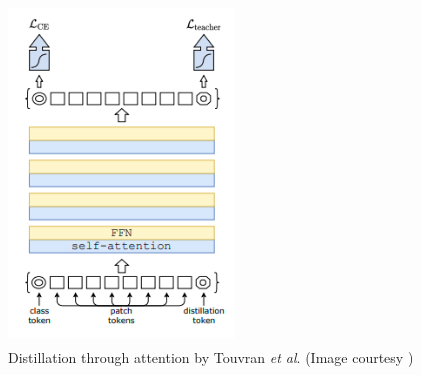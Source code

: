 \begin{figure} [H]
	\centering
	\includegraphics[width=6cm, height=9cm] {assets/img/deit.png}
	\caption{Distillation through attention by Touvran \textit{et al}. (Image courtesy \cite{deit})}
\end{figure}
